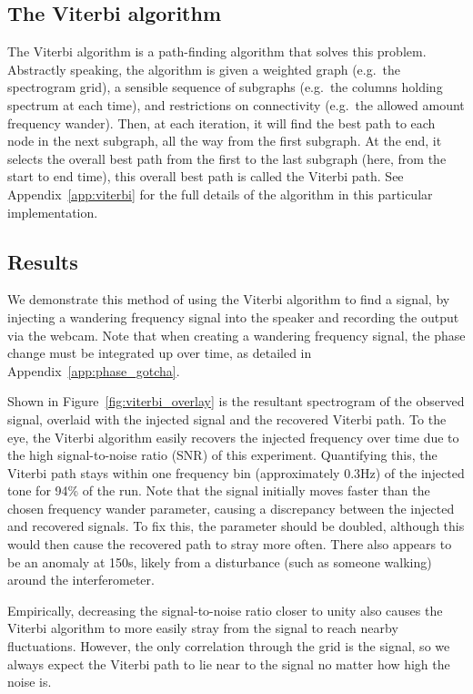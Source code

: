 \documentclass[prb,preprint]{revtex4-1}
\begin{document}
\subsection{The Viterbi algorithm}

The Viterbi algorithm is a path-finding algorithm that solves this problem.
Abstractly speaking, the algorithm is given a weighted graph (e.g.\ the spectrogram grid), a sensible sequence of subgraphs (e.g.\ the columns holding spectrum at each time), and restrictions on connectivity (e.g.\ the allowed amount frequency wander). Then, at each iteration, it will find the best path to each node in the next subgraph, all the way from the first subgraph. At the end, it selects the overall best path from the first to the last subgraph (here, from the start to end time), this overall best path is called the Viterbi path. See Appendix~\ref{app:viterbi} for the full details of the algorithm in this particular implementation.

\subsection{Results}

We demonstrate this method of using the Viterbi algorithm to find a signal, by injecting a wandering frequency signal into the speaker and recording the output via the webcam.
Note that when creating a wandering frequency signal, the phase change must be integrated up over time, as detailed in Appendix~\ref{app:phase_gotcha}.

Shown in Figure~\ref{fig:viterbi_overlay} is the resultant spectrogram of the observed signal, overlaid with the injected signal and the recovered Viterbi path.
To the eye, the Viterbi algorithm easily recovers the injected frequency over time due to the high signal-to-noise ratio (SNR) of this experiment. Quantifying this, the Viterbi path stays within one frequency bin (approximately 0.3Hz) of the injected tone for 94\% of the run.
Note that the signal initially moves faster than the chosen frequency wander parameter, causing a discrepancy between the injected and recovered signals. To fix this, the parameter should be doubled, although this would then cause the recovered path to stray more often. There also appears to be an anomaly at 150s, likely from a disturbance (such as someone walking) around the interferometer.

Empirically, decreasing the signal-to-noise ratio closer to unity also causes the Viterbi algorithm to more easily stray from the signal to reach nearby fluctuations. However, the only correlation through the grid is the signal, so we always expect the Viterbi path to lie near to the signal no matter how high the noise is.
\end{document}
